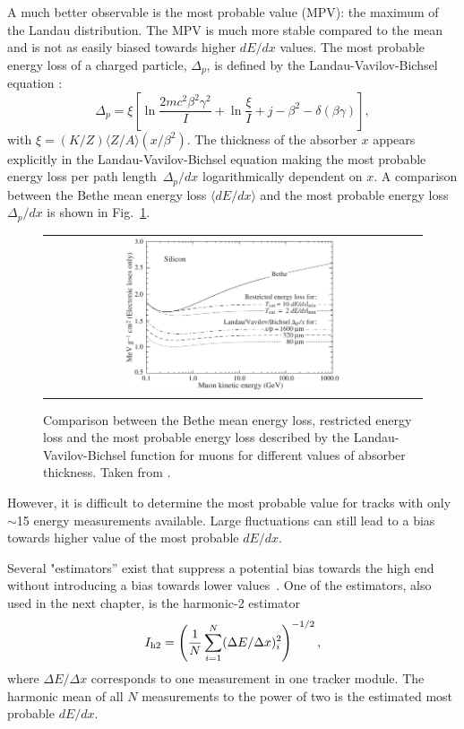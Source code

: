 A much better observable is the most probable value (MPV): the maximum of the Landau distribution.
The MPV is much more stable compared to the mean and is not as easily biased towards higher $dE/dx$ values. 
The most probable energy loss of a charged particle, $\Delta_p$, is defined by the Landau-Vavilov-Bichsel equation \cite{bib:Bichsel:MPV_1988}:
\begin{equation}
\Delta_p = \xi \left[ \ln \frac{2mc^2\beta^2\gamma^2}{I}  + \ln\frac{\xi}{I} + j - \beta^2 - \delta(\beta\gamma)  \right],
\label{eq:Landau_Vavilov_Bichsel}
\end{equation}
with $\xi=(K/Z)\langle Z/A \rangle (x/\beta^2)$. 
The thickness of the absorber $x$ appears explicitly in the Landau-Vavilov-Bichsel equation making the most probable energy loss per path \mbox{length $\Delta_p/dx$} logarithmically dependent on $x$.
A comparison between the Bethe mean energy loss $\langle dE/dx \rangle$ and the most probable energy loss $\Delta_p/dx$ is shown in Fig.~\ref{fig:dEdx_Bethe_Landau}.
\begin{figure}[!bt]
  \centering 
  \begin{tabular}{c}
  \includegraphics[width=0.6\textwidth]{figures/analysis/dEdx_Bethe_Landau.png}
  \end{tabular}
  \caption{Comparison between the Bethe mean energy loss, restricted energy loss and the most probable energy loss described by the Landau-Vavilov-Bichsel function for muons for different values of absorber thickness. 
           Taken from \cite{bib:PDG_2014}.} 
  \label{fig:dEdx_Bethe_Landau}
\end{figure}
However, it is difficult to determine the most probable value for tracks with only $\sim$15 energy measurements available.
Large fluctuations can still lead to a bias towards higher value of the most probable $dE/dx$.

Several "estimators'' exist that suppress a potential bias towards the high end without introducing a bias towards lower values~\cite{bib:Quertenmont_2010}.
One of the estimators, also used in the next chapter, is the harmonic-2 estimator
\begin{equation}
I_{\text{h2}}=\left( \frac{1}{N}\sum_{i=1}^{N}(\Delta E/\Delta x)_i^2 \right)^{-1/2},
\label{eq:Harmonic2Estimator}
\end{equation}
where $\Delta E /\Delta x$ corresponds to one measurement in one tracker module. 
The harmonic mean of all $N$ measurements to the power of two is the estimated most probable $dE/dx$.\\

